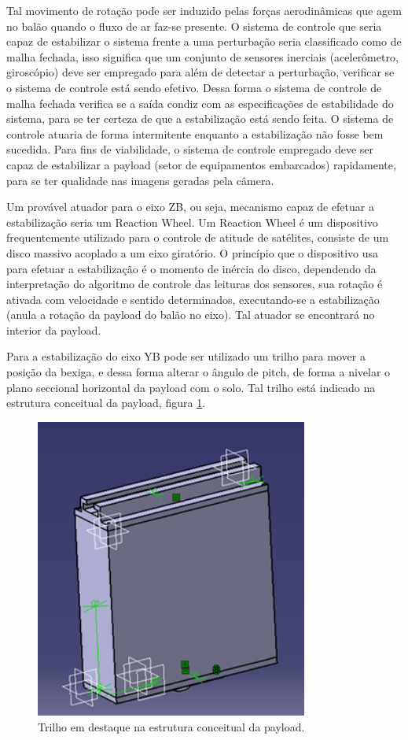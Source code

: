 Tal movimento de rotação pode ser induzido pelas forças aerodinâmicas que agem no balão quando o fluxo de ar faz-se presente. O sistema de controle que seria capaz de estabilizar o sistema frente a uma perturbação seria classificado como de malha fechada, isso significa que um conjunto de sensores inerciais (acelerômetro, giroscópio) deve ser empregado para além de detectar a perturbação, verificar se o sistema de controle está sendo efetivo. Dessa forma o sistema de controle de malha fechada verifica se a saída condiz com as especificações de estabilidade do sistema, para se ter certeza de que a estabilização está sendo feita. O sistema de controle atuaria de forma intermitente enquanto a estabilização não fosse bem sucedida. Para fins de viabilidade, o sistema de controle empregado deve ser capaz de estabilizar a payload (setor de equipamentos embarcados) rapidamente, para se ter qualidade nas imagens geradas pela câmera.

Um provável atuador para o eixo ZB, ou seja, mecanismo capaz de efetuar a estabilização seria um Reaction Wheel. Um Reaction Wheel é um dispositivo frequentemente utilizado para o controle de atitude de satélites, consiste de um disco massivo acoplado a um eixo giratório. O princípio que o dispositivo usa para efetuar a estabilização é o momento de inércia do disco, dependendo da interpretação do algoritmo de controle das leituras dos sensores, sua rotação é ativada com velocidade e sentido determinados, executando-se a estabilização (anula a rotação da payload do balão no eixo). Tal atuador se encontrará no interior da payload.

Para a estabilização do eixo YB pode ser utilizado um trilho para mover a posição da bexiga, e dessa forma alterar o ângulo de pitch, de forma a nivelar o plano seccional horizontal da payload com o solo. Tal trilho está indicado na estrutura conceitual da payload, figura \ref{img:trilhoestrutura}.

\begin{figure}[H]
  \centering
  \includegraphics[width=0.8\textwidth]{figuras/e2}
  \caption{Trilho em destaque na estrutura conceitual da payload.}
  \label{img:trilhoestrutura}
\end{figure}


